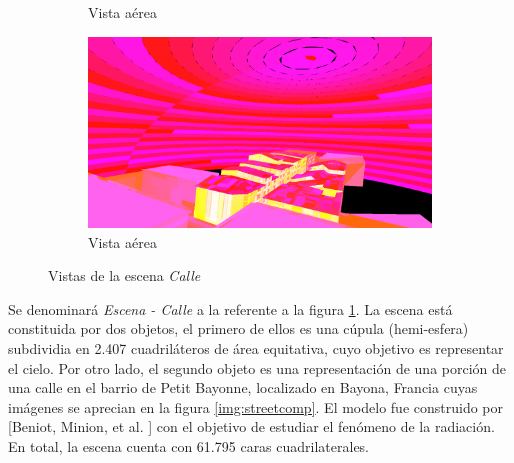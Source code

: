 \begin{figure}[H]
\begin{subfigure}{0.45\textwidth}
		\caption{Vista aérea}
	\end{subfigure}
	\begin{subfigure}{0.45\textwidth}
		\includegraphics[width=1\linewidth]{assets/street4}
		\caption{Vista aérea}
	\end{subfigure}
	\caption{Vistas de la escena \textit{Calle}}
	\label{img:street}
\end{figure}

Se denominará \textit{Escena - Calle} a la referente a la figura \ref{img:street}. La escena está constituida por dos objetos, el primero de ellos es una cúpula (hemi-esfera) subdividia en 2.407 cuadriláteros de área equitativa, cuyo objetivo es representar el cielo. Por otro lado, el segundo objeto es una representación de una porción de una calle en el barrio de Petit Bayonne, localizado en Bayona, Francia cuyas imágenes se aprecian en la figura \ref{img:streetcomp}. El modelo fue construido por [Beniot, Minion, et al. \cite{Benoit}] con el objetivo de estudiar el fenómeno de la radiación. En total, la escena cuenta con 61.795 caras cuadrilaterales.


